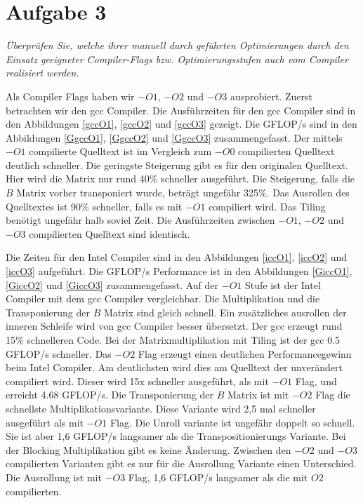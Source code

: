 \chapter{Aufgabe 3}
\textit{Überprüfen Sie,  welche  ihrer  manuell  durch geführten  Optimierungen durch  den Einsatz  geeigneter  Compiler-Flags  bzw.  Optimierungsstufen  auch  vom  Compiler realisiert werden.} \newline

Als Compiler Flags haben wir $-O1$, $-O2$ und $-O3$ ausprobiert. Zuerst betrachten wir den gcc Compiler. Die Ausführzeiten für den gcc Compiler sind in den Abbildungen \ref{gccO1}, \ref{gccO2} und \ref{gccO3} gezeigt. Die GFLOP/s sind in den Abbildungen \ref{GgccO1}, \ref{GgccO2} und \ref{GgccO3} zusammengefasst. Der mittels $-O1$ compilierte Quelltext ist im Vergleich zum $-O0$ compilierten Quelltext deutlich schneller. Die geringste Steigerung gibt es für den originalen Quelltext. Hier wird die Matrix nur rund 40\% schneller ausgeführt. Die Steigerung, falls die $B$ Matrix vorher transponiert wurde, beträgt ungefähr 325\%. Das Ausrollen des Quelltextes ist 90\% schneller, falls es mit $-O1$ compiliert wird. Das Tiling benötigt ungefähr halb soviel Zeit. 
Die Ausführzeiten zwischen $-O1$, $-O2$ und $-O3$ compilierten Quelltext sind identisch.

Die Zeiten für den Intel Compiler sind in den Abbildungen \ref{iccO1}, \ref{iccO2} und \ref{iccO3} aufgeführt. Die GFLOP/s Performance ist in den Abbildungen \ref{GiccO1}, \ref{GiccO2} und \ref{GiccO3} zusammengefasst. Auf der $-O1$ Stufe ist der Intel Compiler mit dem gcc Compiler vergleichbar. Die Multiplikation und die Transponierung der $B$ Matrix sind gleich schnell. Ein zusätzliches ausrollen der inneren Schleife wird von gcc Compiler besser übersetzt. Der gcc erzeugt rund 15\% schnelleren Code. Bei der Matrixmultiplikation mit Tiling ist der gcc 0.5 GFLOP/s schneller. Das $-O2$ Flag erzeugt einen deutlichen Performancegewinn beim Intel Compiler. Am deutlichsten wird dies am Quelltext der unverändert compiliert wird. Dieser wird 15x schneller ausgeführt, als mit $-O1$ Flag, und erreicht 4.68 GFLOP/s. Die Transponierung der $B$ Matrix ist mit $-O2$ Flag die schnellste Multiplikationsvariante. Diese Variante wird 2,5 mal schneller ausgeführt als mit $-O1$ Flag. Die Unroll variante ist ungefähr doppelt so schnell. Sie ist aber 1,6 GFLOP/s langsamer als die Transpositionierungs Variante. Bei der Blocking Multiplikation gibt es keine Änderung. Zwischen den $-O2$ und $-O3$ compilierten Varianten gibt es nur für die Ausrollung Variante einen Unterschied. Die Ausrollung ist mit $-O3$ Flag, 1,6 GFLOP/s langsamer als die mit $O2$ compilierten. 

